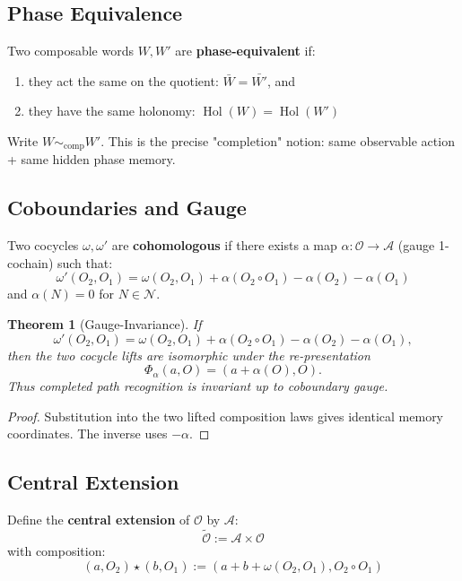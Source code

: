 \documentclass[12pt, oneside]{article}
\newtheorem{theorem}{Theorem}[section]
\DeclareMathOperator{\Hol}{Hol}
\newcommand{\N}{\mathcal{N}}
\newcommand{\A}{\mathcal{A}}
\newcommand{\Opr}{\mathcal{O}}
\begin{document}
\subsection{Phase Equivalence}

Two composable words $W, W'$ are \textbf{phase-equivalent} if:
\begin{enumerate}
    \item they act the same on the quotient: $\bar{W} = \bar{W'}$, and
    \item they have the same holonomy: $\Hol(W) = \Hol(W')$
\end{enumerate}
Write $W \sim_{\text{comp}} W'$. This is the precise "completion" notion: same observable action + same hidden phase memory.

\subsection{Coboundaries and Gauge}

Two cocycles $\omega, \omega'$ are \textbf{cohomologous} if there exists a map $\alpha: \Opr \rightarrow \A$ (gauge 1-cochain) such that:
\begin{equation}
\omega'(O_2, O_1) = \omega(O_2, O_1) + \alpha(O_2 \circ O_1) - \alpha(O_2) - \alpha(O_1)
\end{equation}
and $\alpha(N) = 0$ for $N \in \N$.

\begin{theorem}[Gauge-Invariance]
If
\[
\omega'(O_2,O_1)=\omega(O_2,O_1)+\alpha(O_2\circ O_1)-\alpha(O_2)-\alpha(O_1),
\]
then the two cocycle lifts are isomorphic under the re-presentation
\[
\Phi_\alpha(a,O)=(a+\alpha(O),O).
\]
Thus completed path recognition is invariant up to coboundary gauge.
\end{theorem}
\begin{proof}
Substitution into the two lifted composition laws gives identical memory coordinates. The inverse uses $-\alpha$.
\end{proof}

\subsection{Central Extension}

Define the \textbf{central extension} of $\Opr$ by $\A$:
\begin{equation}
\widetilde{\Opr} := \A \times \Opr
\end{equation}
with composition:
\begin{equation}
(a, O_2) \star (b, O_1) := (a + b + \omega(O_2, O_1), O_2 \circ O_1)
\end{equation}
\end{document}
